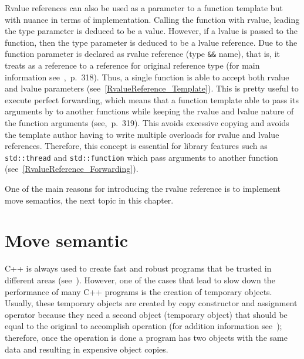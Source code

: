 \documentclass[11pt]{report}
\begin{document}
Rvalue references can also be used as a parameter to a function template but with nuance in terms of implementation. Calling the function with rvalue, leading the type parameter is deduced to be a value. However, if a lvalue is passed to the function, then the type parameter is deduced to be a lvalue reference. Due to the function parameter is declared as rvalue reference (type \texttt{\&\&} name), that is, it treats as a reference to a reference for original reference type (for main information see~\cite{Williams:2012:CCA},~p.~318). Thus, a single function is able to accept both rvalue and lvalue parameters (see~\ref{RvalueReference_Template}). This is pretty useful to execute perfect forwarding, which means that a function template able to pass its arguments by to another functions while keeping the rvalue and lvalue nature of the function arguments (see\cite{Williams:2012:CCA},~p.~319). This avoids excessive copying and avoids the template author having to write multiple overloads for rvalue and lvalue references. Therefore, this concept is essential for library features such as \texttt{std::thread} and \texttt{std::function} which pass arguments to another function (see~\ref{RvalueReference_Forwarding}).

One of the main reasons for introducing the rvalue reference is to implement move semantics, the next topic in this chapter.

\section{Move semantic}
\label{section: Move semantic}
C++ is always used to create fast and robust programs that be trusted in different areas (see~\cite{Stroustrup:2012:Cpp11}). However, one of the cases that lead to slow down the performance of many C++ programs is the creation of temporary objects. Usually, these temporary objects are created by copy constructor and assignment operator because they need a second object (temporary object) that should be equal to the original to accomplish operation (for addition information see~\cite{Stroustrup:2012:Cpp11}); therefore, once the operation is done a program has two objects with the same data and resulting in expensive object copies.
\end{document}
